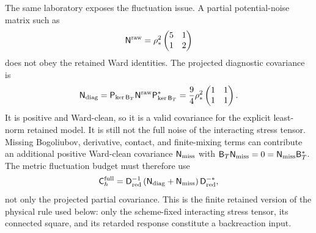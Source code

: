 \begin{example}
The same laboratory exposes the fluctuation issue.  A partial potential-noise
matrix such as
\[
  \mathsf N^{\rm raw}
  =
  \rho_*^2
  \begin{pmatrix}
    5&1\\
    1&2
  \end{pmatrix}
\]
does not obey the retained Ward identities.  The projected diagnostic
covariance is
\begin{equation}
  \mathsf N_{\rm diag}
  =
  \mathsf P_{\ker\mathsf B_T}\mathsf N^{\rm raw}
  \mathsf P_{\ker\mathsf B_T}^*
  =
  \frac94\rho_*^2
  \begin{pmatrix}
    1&1\\
    1&1
  \end{pmatrix}.
  \label{eq:semiclassical-finite-ward-laboratory-noise}
\end{equation}
It is positive and Ward-clean, so it is a valid covariance for the explicit
least-norm retained model.  It is still not the full noise of the interacting
stress tensor.  Missing Bogoliubov, derivative, contact, and finite-mixing
terms can contribute an additional positive Ward-clean covariance
\(\mathsf N_{\rm miss}\) with
\(\mathsf B_T\mathsf N_{\rm miss}=0=\mathsf N_{\rm miss}\mathsf B_T^*\).  The
metric fluctuation budget must therefore use
\[
  \mathsf C_h^{\rm full}
  =
  \mathsf D^{-1}_{\rm red}
  \left(\mathsf N_{\rm diag}+\mathsf N_{\rm miss}\right)
  \mathsf D_{\rm red}^{-*},
\]
not only the projected partial covariance.  This is the finite retained
version of the physical rule used below: only the scheme-fixed interacting
stress tensor, its connected square, and its retarded response constitute a
backreaction input.
\end{example}

